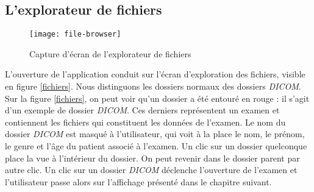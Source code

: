 \subsection{L'explorateur de fichiers}

\begin{figure}[h]
\begin{center}
    \texttt{[image: file-browser]}
\end{center}
    \caption{Capture d'écran de l'explorateur de fichiers}
    \label{fichiers}                      
\end{figure}

L'ouverture de l'application conduit sur l'écran d'exploration des fichiers, visible en figure \vref{fichiers}.
Nous distinguons les dossiers normaux des dossiers \emph{DICOM}. Sur la figure \vref{fichiers}, on peut voir qu'un dossier a été entouré en rouge : il s'agit d'un exemple de dossier \emph{DICOM}. Ces derniers représentent un examen et contiennent les fichiers qui constituent les données de l'examen. Le nom du dossier \emph{DICOM} est masqué à l'utilisateur, qui voit à la place le nom, le prénom, le genre et l'âge du patient associé à l'examen.
Un clic sur un dossier quelconque place la vue à l'intérieur du dossier. On peut revenir dans le dossier parent par autre clic. Un clic sur un dossier \emph{DICOM} déclenche l'ouverture de l'examen et l'utilisateur passe alors sur l'affichage présenté dans le chapitre suivant.